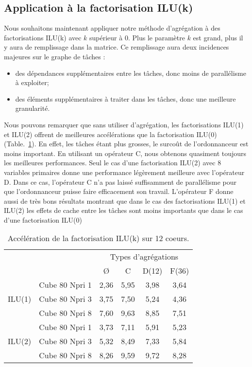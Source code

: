 \subsection{Application à la factorisation ILU(k)}
\label{sec:res_iluk}
Nous souhaitons maintenant appliquer notre méthode d'agrégation à des factorisations ILU(k) avec $k$ supérieur à 0.
%
Plus le paramètre $k$ est grand, plus il y aura de remplissage dans la matrice.
%
Ce remplissage aura deux incidences majeures sur le graphe de tâches :
\begin{itemize}
  \item des dépendances supplémentaires entre les tâches, donc moins de parallélisme à exploiter;
  \item des éléments supplémentaires à traiter dans les tâches, donc une meilleure granularité.
\end{itemize}


Nous pouvons remarquer que sans utiliser d'agrégation, les factorisations ILU(1) et ILU(2) offrent de meilleures accélérations que la factorisation ILU(0) (Table.~\ref{tab:iluk_facto}).
%
En effet, les tâches étant plus grosses, le surcoût de l'ordonnanceur est moins important.
%
En utilisant un opérateur C, nous obtenons quasiment toujours les meilleures performances.
%
Seul le cas d'une factorisation ILU(2) avec 8 variables primaires donne une performance légèrement meilleure avec l'opérateur D.
%
Dans ce cas, l'opérateur C n'a pas laissé suffisamment de parallélisme pour que l'ordonnanceur puisse faire efficacement son travail.
%
L'opérateur F donne aussi de très bons résultats montrant que dans le cas des factorisations ILU(1) et ILU(2) les effets de cache entre les tâches sont moins importants que dans le cas d'une factorisation ILU(0)

\begin{table}[h!]
\begin{center}
  \begin{tabular}{|c|r|c|c|c|c|}
    \hline
       &   & \multicolumn{4}{|c|}{Types d'agrégations}\\
       &                & \O   &  C   & D(12) & F(36) \\
    \hline
       & Cube 80 Npri 1 & 2,36 & 5,95 & 3,98  & 3,64\\
ILU(1) & Cube 80 Npri 3 & 3,75 & 7,50 & 5,24  & 4,36\\
       & Cube 80 Npri 8 & 7,60 & 9,63 & 8,85  & 7,51\\
    \hline
       & Cube 80 Npri 1 & 3,73 & 7,11 & 5,91  & 5,23\\
ILU(2) & Cube 80 Npri 3 & 5,32 & 8,49 & 7,33  & 5,84\\
       & Cube 80 Npri 8 & 8,26 & 9,59 & 9,72  & 8,28\\
    \hline
  \end{tabular}
  \caption{Accélération de la factorisation ILU(k) sur 12 coeurs.}
  \label{tab:iluk_facto}
\end{center}
\end{table}
